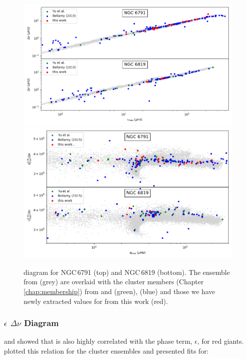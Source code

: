 \begin{figure}
    \centering
    \includegraphics[width=\linewidth]{Chapter5/numax_dnu_both.png}
    \includegraphics[width=\linewidth]{Chapter5/numax_dnusc_both.png}
    \caption[\numax{} \textendash \dnu{} diagram for NGC\,6791 and NGC\, 6819]{\numax{} \textendash \dnu{} diagram for NGC\,6791 (top) and NGC\,6819 (bottom). The ensemble from \cite{yu_asteroseismology_2018-1} (grey) are overlaid with the cluster members (Chapter \ref{chap:membership}) from \cite{yu_asteroseismology_2018-1} and \cite{yu_asteroseismology_2020} (green), \cite{bellamy_using_2015} (blue) and those we have newly extracted values for from this work (red). }
    \label{fig:nike_6791}
\end{figure}

\subsubsection{$\epsilon$ \textendash $\Delta\nu$ Diagram}

\cite{huber_asteroseismology_2010} and \cite{mosser_mixed_2011} showed that \dnu{} is also highly correlated with the phase term, $\epsilon$, for red giants. \cite{corsaro_asteroseismology_2012} plotted this relation for the cluster ensembles and presented fits for:

